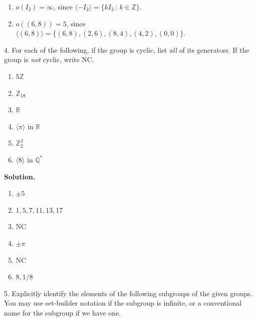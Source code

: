 \documentclass[10pt,]{book}
\theoremstyle{plain}
\theoremstyle{definition}
\theoremstyle{definition}
\theoremstyle{definition}
\theoremstyle{definition}
\numberwithin{equation}{section}
\def\Z{\mathbb{Z}}
\def\R{\mathbb{R}}
\def\Q{\mathbb{Q}}
\begin{document}
\begin{exerciselist}
\begin{enumerate}[label=(\alph*)]
\item\hypertarget{li-294}{}\(o(I_2)=\infty\), since \(\langle -I_2\rangle =\{kI_2\,:\,k\in \Z\}\).%
\item\hypertarget{li-295}{}\(o((6,8))=5\), since \(\langle (6,8)\rangle =\{(6,8),(2,6),(8,4),(4,2),(0,0)\}\).%
\end{enumerate}
\item[4.]\hypertarget{exercise-37}{}For each of the following, if the group is cyclic, list \emph{all} of its generators. If the group is \emph{not} cyclic, write NC. \leavevmode%
\begin{enumerate}[label=(\alph*)]
\item\hypertarget{li-296}{}\(5\Z\)%
\item\hypertarget{li-297}{}\(\Z_{18}\)%
\item\hypertarget{li-298}{}\(\R\)%
\item\hypertarget{li-299}{}\(\langle \pi\rangle\) in \(\R\)%
\item\hypertarget{li-300}{}\(\Z_2^2\)%
\item\hypertarget{li-301}{}\(\langle 8\rangle\) in \(\Q^*\)%
\end{enumerate}
%
\par\smallskip
\par\smallskip
\noindent\textbf{Solution.}\hypertarget{solution-37}{}\quad
\leavevmode%
\begin{enumerate}[label=(\alph*)]
\item\hypertarget{li-302}{}\(\pm 5\)%
\item\hypertarget{li-303}{}\(1,5,7,11,13,17\)%
\item\hypertarget{li-304}{}NC%
\item\hypertarget{li-305}{}\(\pm \pi\)%
\item\hypertarget{li-306}{}NC%
\item\hypertarget{li-307}{}\(8,1/8\)%
\end{enumerate}
\item[5.]\hypertarget{exercise-38}{}Explicitly identify the elements of the following subgroups of the given groups. You may use set-builder notation if the subgroup is infinite, or a conventional name for the subgroup if we have one. \leavevmode%
\begin{enumerate}[label=(\alph*)]
\item\hypertarget{li-308}{}\(\langle 3\rangle\) in \(\Z\)%
\item\hypertarget{li-309}{}\(\langle i\rangle\) in \(C^*\)%
\item\hypertarget{li-310}{}\(\langle A\rangle\), for \(A=\left[ \begin{array}{cc}

\end{array}
\end{enumerate}
\end{exerciselist}
\end{document}
